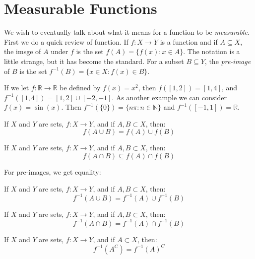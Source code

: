 \documentclass[crop=false,class=book,oneside]{standalone}
\begin{document}
    \section{Measurable Functions}
        We wish to eventually talk about what it means for a
        function to be \textit{measurable}. First we do a quick review
        of function. If $f:X\rightarrow{Y}$ is a function and if
        $A\subseteq{X}$, the imsge of $A$ under $f$ is the set
        $f(A)=\{f(x):x\in{A}\}$. The notation is a little strange, but
        it has become the standard. For a subset $B\subseteq{Y}$, the
        \textit{pre-image} of $B$ is the set
        $f^{-1}(B)=\{x\in{X}:f(x)\in{B}\}$.
        \begin{lexample}
            If we let $f:\mathbb{R}\rightarrow\mathbb{R}$ be defined
            by $f(x)=x^{2}$, then $f([1,2])=[1,4]$, and
            $f^{-1}([1,4])=[1,2]\cup[-2,-1]$. As another example we
            can consider $f(x)=\sin(x)$. Then
            $f^{-1}(\{0\})=\{n\pi:n\in\mathbb{N}\}$ and
            $f^{-1}([-1,1])=\mathbb{R}$.
        \end{lexample}
        \begin{theorem}
            If $X$ and $Y$ are sets, $f:X\rightarrow{Y}$,
            and if $A,B\subset{X}$, then:
            \begin{equation}
                f(A\cup{B})=f(A)\cup{f}(B)
            \end{equation}
        \end{theorem}
        \begin{theorem}
            If $X$ and $Y$ are sets, $f:X\rightarrow{Y}$,
            and if $A,B\subset{X}$, then:
            \begin{equation}
                f(A\cap{B})\subseteq{f(A)\cap{f}(B)}
            \end{equation}
        \end{theorem}
        For pre-images, we get equality:
        \begin{theorem}
            If $X$ and $Y$ are sets, $f:X\rightarrow{Y}$,
            and if $A,B\subset{X}$, then:
            \begin{equation}
                f^{-1}(A\cup{B})=f^{-1}(A)\cup{f}^{-1}(B)
            \end{equation}
        \end{theorem}
        \begin{theorem}
            If $X$ and $Y$ are sets, $f:X\rightarrow{Y}$,
            and if $A,B\subset{X}$, then:
            \begin{equation}
                f^{-1}(A\cap{B})=f^{-1}(A)\cap{f}^{-1}(B)
            \end{equation}
        \end{theorem}
        \begin{theorem}
            If $X$ and $Y$ are sets, $f:X\rightarrow{Y}$,
            and if $A\subset{X}$, then:
            \begin{equation}
                f^{-1}(A^{C})=f^{-1}(A)^{C}
            \end{equation}
        \end{theorem}
\end{document}
